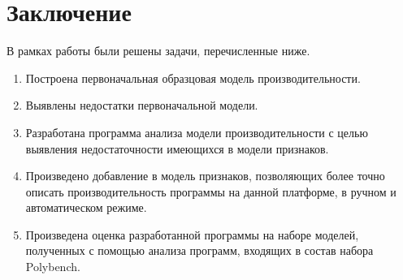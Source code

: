 \section*{Заключение}
%
В рамках работы были решены задачи, перечисленные ниже.
\begin{enumerate}
	\item Построена первоначальная образцовая модель производительности.
	\item Выявлены недостатки первоначальной модели.
	\item Разработана программа анализа модели производительности с целью выявления недостаточности имеющихся в модели признаков.
	\item Произведено добавление в модель признаков, позволяющих более точно описать производительность программы на данной платформе, в ручном и автоматическом режиме.
	\item Произведена оценка разработанной программы на наборе моделей, полученных с помощью анализа программ, входящих в состав набора Polybench.
\end{enumerate}